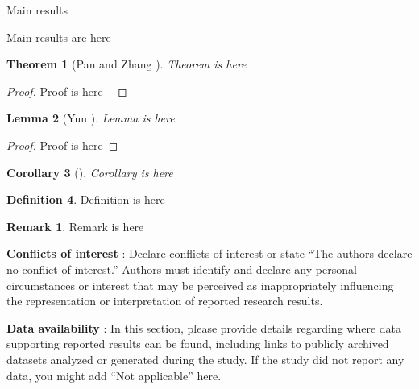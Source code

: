 \documentclass[10pt,twoside,reqno]{amsart} %
\makeatletter
\renewcommand{\section}{\@startsection{section}{1}
   \z@{.7\linespacing\@plus\linespacing}{.5\linespacing}
   {\normalfont\upshape\bfseries\centering}}
\theoremstyle{plain}
\newtheorem{thm}{Theorem}[section]
\newtheorem{lem}[thm]{Lemma}
\newtheorem{cor}[thm]{Corollary}
\theoremstyle{definition}
\newtheorem{defn}[thm]{Definition}
\newtheorem{rem}{Remark}[section]
\makeatother
\begin{document}
\section{Main results}


Main results are here

\begin{thm}[Pan and Zhang {\cite[p. 682 (1.5)]{bc}}]
Theorem is here
\end{thm}
\begin{proof}
Proof is here ~\cite[Proposition 1.4]{cp}
\end{proof}

\begin{lem}[Yun \cite{pang}]
Lemma is here
\end{lem}
\begin{proof}
Proof is here
\end{proof}

\begin{cor}[\cite{pang}]
Corollary is here
\end{cor}

\begin{defn}
Definition is here
\end{defn}

\begin{rem}
Remark is here
\end{rem}


\bigskip
{\bf Conflicts of interest} : {Declare conflicts of interest or state ``The authors declare no conflict of interest.'' Authors must identify and declare any personal circumstances or interest that may be perceived as inappropriately influencing the representation or interpretation of reported research results.} 

\bigskip
{\bf Data availability} : {In this section, please provide details regarding where data supporting reported results can be found, including links to publicly archived datasets analyzed or generated during the study. If the study did not report any data, you might add ``Not applicable'' here.} 
\end{document}
